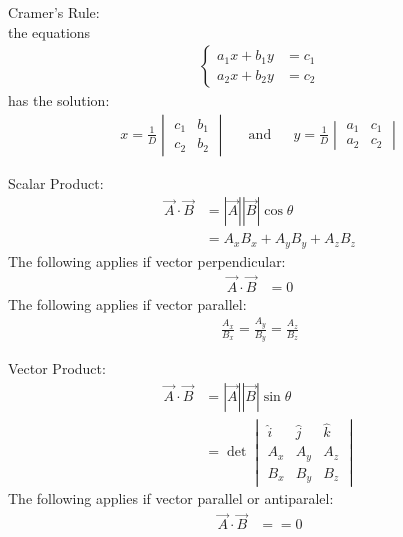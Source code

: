 \documentclass[../main.tex]{subfiles}
\begin{document}
Cramer's Rule:\\
the equations
\begin{align*}
    \begin{cases}
        a_1x+b_1y&=c_1\\
        a_2x+b_2y&=c_2
    \end{cases}
\end{align*}
has the solution:
\begin{align*}
    x=\frac{1}{D}
    \begin{vmatrix}
        c_1&b_1\\
        c_2&b_2
    \end{vmatrix}&&\mathrm{and}&&
    y=\frac{1}{D}
    \begin{vmatrix}
        a_1&c_1\\
        a_2&c_2
    \end{vmatrix}
\end{align*}

Scalar Product:
\begin{align*}
    \vec{A}\cdot\vec{B}&=|\vec{A}||\vec{B}|\cos\theta\\
    &=A_xB_x+A_yB_y+A_zB_z
\end{align*}
The following applies if vector perpendicular:
\begin{align*}
    \vec{A}\cdot\vec{B}&=0
\end{align*}
The following applies if vector parallel:
\begin{align*}
    \frac{A_x}{B_x}=\frac{A_y}{B_y}=\frac{A_z}{B_z}
\end{align*}

Vector Product:
\begin{align*}
    \vec{A}\cdot\vec{B}&=|\vec{A}||\vec{B}|\sin\theta\\
    &=\det\begin{vmatrix}
        \hat{i}&\hat{j}&\hat{k}\\
        A_x&A_y&A_z\\
        B_x&B_y&B_z
    \end{vmatrix}
\end{align*}
The following applies if vector parallel or antiparalel:
\begin{align*}
    \vec{A}\cdot\vec{B}&==0
\end{align*}
\end{document}
